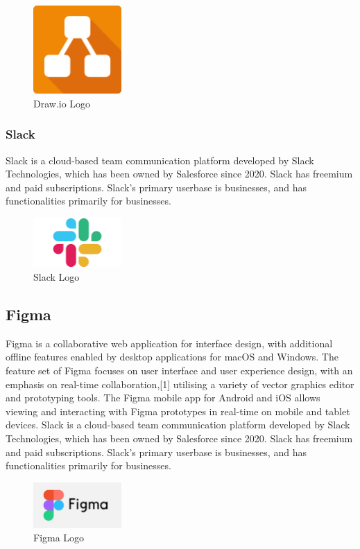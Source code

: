 \begin{figure}[h!]
      \centering
      \includegraphics[width=0.3\textwidth]{images/drawio.png}
      \caption{Draw.io Logo}
      \label{fig:drawio}



\end{figure}
\newpage
\subsubsection{Slack}
Slack is a cloud-based team communication platform developed by Slack Technologies, which has been owned by Salesforce since 2020. Slack has freemium and paid subscriptions. Slack's primary userbase is businesses, and has functionalities primarily for businesses.
\begin{figure}[h!]
      \centering
      \includegraphics[width=0.3\textwidth]{images/slack.jpg}
      \caption{Slack Logo}
      \label{fig:Slack}
\end{figure}
\subsection{Figma}
Figma is a collaborative web application for interface design, with additional offline features enabled by desktop applications for macOS and Windows. The feature set of Figma focuses on user interface and user experience design, with an emphasis on real-time collaboration,[1] utilising a variety of vector graphics editor and prototyping tools. The Figma mobile app for Android and iOS allows viewing and interacting with Figma prototypes in real-time on mobile and tablet devices.
Slack is a cloud-based team communication platform developed by Slack Technologies, which has been owned by Salesforce since 2020. Slack has freemium and paid subscriptions. Slack's primary userbase is businesses, and has functionalities primarily for businesses.
\begin{figure}[h!]
      \centering
      \includegraphics[width=0.3\textwidth]{images/figma.png}
      \caption{Figma Logo}
      \label{fig:Figma}
\end{figure}

